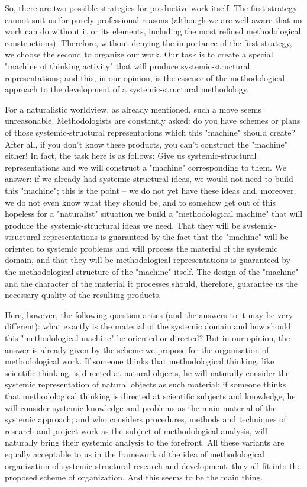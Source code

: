 \documentclass[11pt,a4paper]{article}
\begin{document}
So, there are two possible strategies for productive work itself. The first
strategy cannot suit us for purely professional reasons (although we are well
aware that no work can do without it or its elements, including the most
refined methodological constructions). Therefore, without denying the
importance of the first strategy, we choose the second to organize our work.
Our task is to create a special "machine of thinking activity" that will
produce systemic-structural representations; and this, in our opinion, is the
essence of the methodological approach to the development of a
systemic-structural methodology.

For a naturalistic worldview, as already mentioned, such a move seems
unreasonable. Methodologists are constantly asked: do you have schemes or
plans of those systemic-structural representations which this "machine" should
create? After all, if you don't know these products, you can't construct the
"machine" either! In fact, the task here is as follows: Give us
systemic-structural representations and we will construct a "machine"
corresponding to them. We answer: if we already had systemic-structural ideas,
we would not need to build this "machine"; this is the point – we do not yet
have these ideas and, moreover, we do not even know what they should be, and
to somehow get out of this hopeless for a "naturalist" situation we build a
"methodological machine" that will produce the systemic-structural ideas we
need. That they will be systemic-structural representations is guaranteed by
the fact that the "machine" will be oriented to systemic problems and will
process the material of the systemic domain, and that they will be
methodological representations is guaranteed by the methodological structure
of the "machine" itself. The design of the "machine" and the character of the
material it processes should, therefore, guarantee us the necessary quality of
the resulting products.

Here, however, the following question arises (and the answers to it may be
very different): what exactly is the material of the systemic domain and how
should this "methodological machine" be oriented or directed? But in our
opinion, the answer is already given by the scheme we propose for the
organisation of methodological work. If someone thinks that methodological
thinking, like scientific thinking, is directed at natural objects, he will
naturally consider the systemic representation of natural objects as such
material; if someone thinks that methodological thinking is directed at
scientific subjects and knowledge, he will consider systemic knowledge and
problems as the main material of the systemic approach; and who considers
procedures, methods and techniques of research and project work as the subject
of methodological analysis, will naturally bring their systemic analysis to
the forefront. All these variants are equally acceptable to us in the
framework of the idea of methodological organization of systemic-structural
research and development: they all fit into the proposed scheme of
organization. And this seems to be the main thing.
\end{document}
